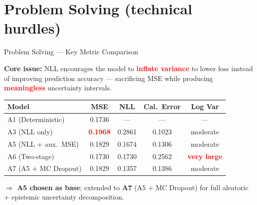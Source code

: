 \documentclass[10pt]{beamer}
\begin{document}

\section[Problem Solving]{Problem Solving (technical hurdles)}

\begin{frame}[shrink=5]{Problem Solving — Key Metric Comparison}

\small
\textbf{Core issue:} NLL encourages the model to \textcolor{red}{\textbf{inflate variance}} to lower loss
instead of improving prediction accuracy ---
sacrificing MSE while producing \textcolor{red}{\textbf{meaningless}} uncertainty intervals.

\vspace{0.4em}

\begin{table}
\centering
\setlength{\tabcolsep}{6pt}
\begin{tabular}{lcccc}
\toprule
\textbf{Model} & \textbf{MSE} & \textbf{NLL} & \textbf{Cal.\ Error} & \textbf{Log Var} \\
\midrule
A1 (Deterministic)       & 0.1736 & ---    & ---    & ---    \\
A3 (NLL only)            & \textcolor{red}{\textbf{0.1968}} & 0.2861 & 0.1023 & moderate \\
A5 (NLL + aux.\ MSE)     & 0.1829 & 0.1674 & 0.1306 & moderate \\
A6 (Two-stage)           & 0.1730 & 0.1730 & 0.2562 & \textcolor{red}{\textbf{very large}} \\
A7 (A5 + MC Dropout)     & 0.1829 & 0.1357 & 0.1386 & moderate \\
\bottomrule
\end{tabular}
\end{table}

\vspace{0.3em}
\centering
\scriptsize
$\Rightarrow$ \textbf{A5 chosen as base}; extended to \textbf{A7} (A5 + MC Dropout)
for full aleatoric + epistemic uncertainty decomposition.

\end{frame}
\end{document}
